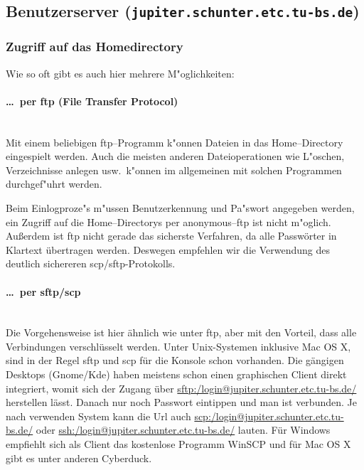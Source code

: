 
\subsection{Benutzerserver (\texttt{jupiter.schunter.etc.tu-bs.de})}

\subsubsection{Zugriff auf das Homedirectory}

Wie so oft gibt es auch hier mehrere M"oglichkeiten: 

\paragraph{\dots\ per ftp (File Transfer Protocol)} \ \\
Mit einem beliebigen \glossar ftp--Programm k"onnen Dateien in das
\glossar Home--Directory eingespielt werden. Auch die meisten anderen
Dateioperationen wie L"oschen, Verzeichnisse anlegen usw.\  k"onnen im
allgemeinen mit solchen Programmen durchgef"uhrt werden.

Beim Einlogproze"s m"ussen Benutzerkennung und Pa"swort angegeben werden, ein
Zugriff auf die \glossar Home--Directorys per anonymous--ftp ist nicht
m"oglich. Außerdem ist ftp nicht gerade das sicherste Verfahren, da
alle Passwörter in Klartext übertragen werden. Deswegen empfehlen wir
die Verwendung des deutlich sichereren scp/sftp-Protokolls.
\paragraph{\dots\ per sftp/scp} \ \\
Die Vorgehensweise ist hier ähnlich wie unter ftp, aber mit den
Vorteil, dass alle Verbindungen verschlüsselt werden. Unter
Unix-Systemen inklusive Mac OS X, sind in der Regel sftp und scp für
die Konsole schon vorhanden. Die gängigen Desktops (Gnome/Kde) haben
meistens schon einen graphischen Client direkt integriert, womit sich
der Zugang über \url{sftp:/login@jupiter.schunter.etc.tu-bs.de/}
herstellen lässt. Danach nur noch Passwort eintippen und man ist
verbunden. Je nach verwenden System kann die Url auch
\url{scp:/login@jupiter.schunter.etc.tu-bs.de/} oder
\url{ssh:/login@jupiter.schunter.etc.tu-bs.de/} lauten. 
Für Windows empfiehlt sich als Client das kostenlose Programm WinSCP
und für Mac OS X gibt es unter anderen Cyberduck. 

